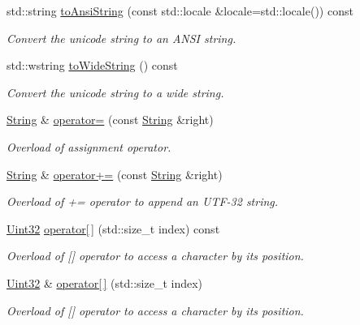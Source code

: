 \begin{DoxyCompactItemize}
std\-::string \hyperlink{classburn_1_1_string_a1a11e9382f744cadaea480a3b70dc1ef}{to\-Ansi\-String} (const std\-::locale \&locale=std\-::locale()) const 
\begin{DoxyCompactList}\small\item\em Convert the unicode string to an A\-N\-S\-I string. \end{DoxyCompactList}\item 
std\-::wstring \hyperlink{classburn_1_1_string_abcaa6ebd5743cc885c15577ca08a62f2}{to\-Wide\-String} () const 
\begin{DoxyCompactList}\small\item\em Convert the unicode string to a wide string. \end{DoxyCompactList}\item 
\hyperlink{classburn_1_1_string}{String} \& \hyperlink{classburn_1_1_string_abbd178f658f0c6951054381013443f05}{operator=} (const \hyperlink{classburn_1_1_string}{String} \&right)
\begin{DoxyCompactList}\small\item\em Overload of assignment operator. \end{DoxyCompactList}\item 
\hyperlink{classburn_1_1_string}{String} \& \hyperlink{classburn_1_1_string_a6410f053b7bab08458e4d0789de3b5f7}{operator+=} (const \hyperlink{classburn_1_1_string}{String} \&right)
\begin{DoxyCompactList}\small\item\em Overload of += operator to append an U\-T\-F-\/32 string. \end{DoxyCompactList}\item 
\hyperlink{namespaceburn_ab40b09022209bd449d317c1f0e95356b}{Uint32} \hyperlink{classburn_1_1_string_ae103536549b576275ea04978e80f7372}{operator\mbox{[}$\,$\mbox{]}} (std\-::size\-\_\-t index) const 
\begin{DoxyCompactList}\small\item\em Overload of \mbox{[}\mbox{]} operator to access a character by its position. \end{DoxyCompactList}\item 
\hyperlink{namespaceburn_ab40b09022209bd449d317c1f0e95356b}{Uint32} \& \hyperlink{classburn_1_1_string_acc1f80f7268b5465d7a3a49cf7927272}{operator\mbox{[}$\,$\mbox{]}} (std\-::size\-\_\-t index)
\begin{DoxyCompactList}\small\item\em Overload of \mbox{[}\mbox{]} operator to access a character by its position. \end{DoxyCompactList}\item 

\end{DoxyCompactItemize}
